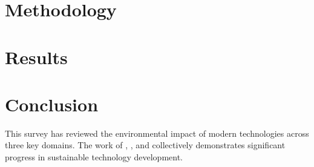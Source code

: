 \documentclass[conference]{IEEEtran}
\begin{document}
\section{Methodology}

\blindtext[2]

\section{Results}

\blindtext[2]

\section{Conclusion}

This survey has reviewed the environmental impact of modern technologies
across three key domains. The work of \cite{Smith2021}, \cite{Garcia2022},
and \cite{Chen2023} collectively demonstrates significant progress in
sustainable technology development.



\end{document}
